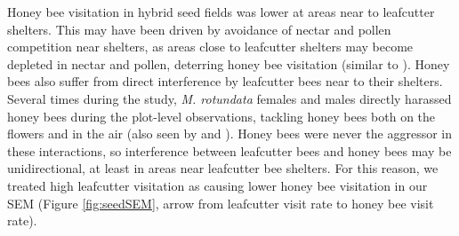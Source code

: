 \documentclass[12pt]{article} %
\begin{document}

Honey bee visitation in hybrid seed fields was lower at areas near to leafcutter shelters. 
This may have been driven by avoidance of nectar and pollen competition near shelters, as areas close to leafcutter shelters may become depleted in nectar and pollen, deterring honey bee visitation (similar to \citealp{currie1997}).
Honey bees also suffer from direct interference by leafcutter bees near to their shelters.
Several times during the study, \textit{M. rotundata} females and males directly harassed honey bees during the plot-level observations, tackling honey bees both on the flowers and in the air (also seen by \citealp{batra1978} and \citealp{waytesMsc}). 
Honey bees were never the aggressor in these interactions, so interference between leafcutter bees and honey bees may be unidirectional, at least in areas near leafcutter bee shelters. 
For this reason, we treated high leafcutter visitation as causing lower honey bee visitation in our SEM (Figure \ref{fig:seedSEM}, arrow from leafcutter visit rate to honey bee visit rate).
\end{document}
